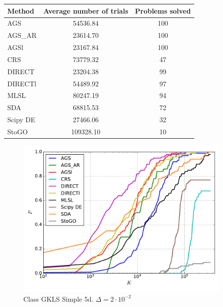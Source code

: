 \documentclass[a4paper]{article}
\begin{document}
\begin{tabular}{lcc}
\hline
 Method   &  Average number of trials  &  Problems solved  \\
\hline
 AGS      &          54536.84          &        100        \\
 AGS\_AR   &          23614.70          &        100        \\
 AGSl     &          23167.84          &        100        \\
 CRS      &          73779.32          &        47         \\
 DIRECT   &          23204.38          &        99         \\
 DIRECTl  &          54489.92          &        97         \\
 MLSL     &          80247.19          &        94         \\
 SDA      &          68815.53          &        72         \\
 Scipy DE &          27466.06          &        32         \\
 StoGO    &         109328.10          &        10         \\
\hline
\end{tabular}
\begin{figure}[H]
  \center
  \includegraphics[width=0.95\textwidth]{../experiments/gklss5d/cmc.pdf}
  \caption{Class GKLS Simple 5d. $\Delta=2\cdot10^{-2}$}
\end{figure}
\end{document}
